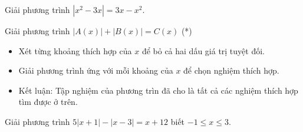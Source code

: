 \begin{vd}%
	Giải phương trình $|x^2 - 3x| = 3x - x^2$.
\end{vd}

\begin{dang}{Giải phương trình $|A(x)| + |B(x)| = C(x)$ \quad(*)}
	\begin{itemize}
		\item Xét từng khoảng thích hợp của $x$ để bỏ cả hai dấu giá trị tuyệt đối.
		\item Giải phương trình ứng với mỗi  khoảng của $x$ để chọn nghiệm thích hợp.
		\item Kết luận: Tập nghiệm của phương trìn đã cho là tất cả các nghiệm thích hợp tìm được ở trên.
	\end{itemize}
\end{dang}

\begin{vd}%
	Giải phương trình $5|x+1| - |x-3| = x+12$ biết $-1 \le x \le 3$.
\end{vd}

